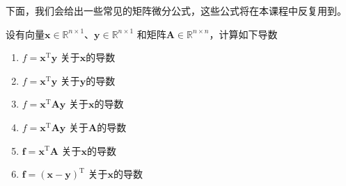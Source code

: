 下面，我们会给出一些常见的矩阵微分公式，这些公式将在本课程中反复用到。

\begin{example}
    设有向量\( \bm{x} \in \mathbb{R}^{n \times 1} \)、\( \bm{y} \in \mathbb{R}^{n \times 1} \) 和矩阵\( \mathbf{A} \in \mathbb{R}^{n \times n} \)，计算如下导数
    \begin{enumerate}
        \item \( f = \bm{x}^{\mathrm{T}} \bm{y} \) 关于\( \bm{x} \)的导数
        \item \( f = \bm{x}^{\mathrm{T}} \bm{y} \) 关于\( \bm{y} \)的导数
        \item \( f = \bm{x}^{\mathrm{T}} \mathbf{A} \bm{y} \) 关于\( \bm{x} \)的导数
        \item \( f = \bm{x}^{\mathrm{T}} \mathbf{A} \bm{y} \) 关于\( \mathbf{A} \)的导数
        \item \( \bm{f} = \bm{x}^{\mathrm{T}} \mathbf{A} \) 关于\( \bm{x} \)的导数
        \item \( \bm{f} = (\bm{x} - \bm{y})^{\mathrm{T}} \) 关于\( \bm{x} \)的导数
    \end{enumerate}
\end{example}
